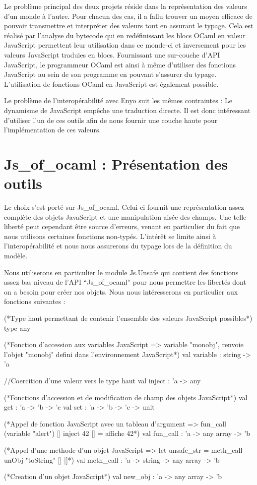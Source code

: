 \documentclass[11pt,a4paper]{report}
\begin{document}
Le problème principal des deux projets réside dans la représentation des valeurs
d'un monde à l'autre. Pour chacun des cas, il a fallu trouver un moyen efficace de
pouvoir transmettre et interpréter des valeurs tout en assurant le typage.
Cela est réalisé par l'analyse du bytecode qui en redéfinissant les blocs OCaml
en valeur JavaScript permettent leur utilisation dans ce monde-ci et inversement pour
les valeurs JavaScript traduies en blocs. Fournissant une sur-couche d'API JavaScript,
le programmeur OCaml est ainsi à même d'utiliser des fonctions JavaScript au sein de son
programme en pouvant s'assurer du typage. L'utilisation de fonctions OCaml en JavaScript
est également possible.

Le problème de l'interopérabilité avec Enyo suit les mêmes contraintes :
Le dynamisme de JavaScript empêche une traduction directe. Il est donc intéressant
d'utiliser l'un de ces outils afin de nous fournir une couche haute pour l'implémentation de
ces valeurs.


\section{Js\_of\_ocaml : Présentation des outils}

Le choix s'est porté sur Js\_of\_ocaml. Celui-ci fournit une représentation assez complète des
objets JavaScript et une manipulation aisée des champs. Une telle liberté peut cependant être source
d'erreurs, venant en particulier du fait que nous utilisons certaines fonctions non-typés.
L'intérêt se limite ainsi à l'interopérabilité et nous nous assurerons du typage lors de la définition
du modèle.

Nous utiliserons en particulier le module Js.Unsafe qui contient des fonctions assez bas niveau
de l'API ``Js\_of\_ocaml'' pour nous permettre les libertés dont on a besoin pour créer nos objets.
Nous nous intéresserons en particulier aux fonctions suivantes :

\begin{OCaml}
(*Type haut permettant de contenir l'ensemble des valeurs JavaScript possibles*)
type any

(*Fonction d'accession aux variables JavaScript
  => variable "monobj", renvoie l'objet "monobj" defini dans l'environnement JavaScript*)
val variable : string -> 'a

//Coercition d'une valeur vers le type haut
val inject : 'a -> any

(*Fonctions d'accession et de modification de champ des objets JavaScript*)
val get : 'a -> 'b -> 'c
val set : 'a -> 'b -> 'c -> unit

(*Appel de fonction JavaScript avec un tableau d'argument
  => fun_call (variable "alert") [| inject 42 |]
  = affiche 42*)
val fun_call : 'a -> any array -> 'b

(*Appel d'une methode d'un objet JavaScript
  => let unsafe_str = meth_call unObj "toString" [| |]*)
val meth_call : 'a -> string -> any array -> 'b

(*Creation d'un objet JavaScript*)
val new_obj : 'a -> any array -> 'b
\end{OCaml}
\end{document}
